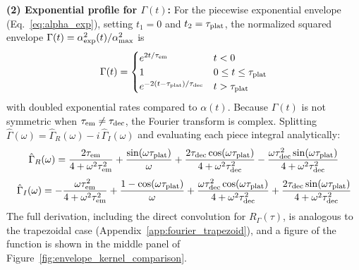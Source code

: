 \documentclass[preprint]{aastex702}
\newcommand{\FT}[1]{\hat{#1}}
\begin{document}
\textbf{(2) Exponential profile for $\Gamma(t)$:}
For the piecewise exponential envelope (Eq.~\ref{eq:alpha_exp}), setting $t_1 = 0$ and $t_2 = \tau_{\rm plat}$, the normalized squared envelope $\Gamma(t) = \alpha_{\rm exp}^2(t)/\alpha_{\max}^2$ is
\begin{equation}
    \Gamma(t) =
    \begin{cases}
        e^{2t/\tau_{\rm em}} & t < 0 \\
        1 & 0 \leq t \leq \tau_{\rm plat} \\
        e^{-2(t - \tau_{\rm plat})/\tau_{\rm dec}} & t > \tau_{\rm plat}
    \end{cases}
    \label{eq:Gamma_exp}
\end{equation}
with doubled exponential rates compared to $\alpha(t)$.
Because $\Gamma(t)$ is not symmetric when $\tau_{\rm em} \neq \tau_{\rm dec}$, the Fourier transform is complex.
Splitting $\FT{\Gamma}(\omega) = \FT{\Gamma}_R(\omega) - i\,\FT{\Gamma}_I(\omega)$ and evaluating each piece integral analytically:
\begin{equation}
    \FT{\Gamma}_R(\omega) =
        \frac{2\tau_{\rm em}}{4 + \omega^2\tau_{\rm em}^2}
        + \frac{\sin(\omega\tau_{\rm plat})}{\omega}
        + \frac{2\tau_{\rm dec}\cos(\omega\tau_{\rm plat})}{4 + \omega^2\tau_{\rm dec}^2}
        - \frac{\omega\tau_{\rm dec}^2\sin(\omega\tau_{\rm plat})}{4 + \omega^2\tau_{\rm dec}^2}
    \label{eq:Gamma_hat_exp_R}
\end{equation}
\begin{equation}
    \FT{\Gamma}_I(\omega) =
        -\frac{\omega\tau_{\rm em}^2}{4 + \omega^2\tau_{\rm em}^2}
        + \frac{1 - \cos(\omega\tau_{\rm plat})}{\omega}
        + \frac{\omega\tau_{\rm dec}^2\cos(\omega\tau_{\rm plat})}{4 + \omega^2\tau_{\rm dec}^2}
        + \frac{2\tau_{\rm dec}\sin(\omega\tau_{\rm plat})}{4 + \omega^2\tau_{\rm dec}^2}
    \label{eq:Gamma_hat_exp_I}
\end{equation}
The full derivation, including the direct convolution for $R_\Gamma(\tau)$, is analogous to the trapezoidal case (Appendix~\ref{app:fourier_trapezoid}), and a figure of the function is shown in the middle panel of Figure~\ref{fig:envelope_kernel_comparison}.
\end{document}
